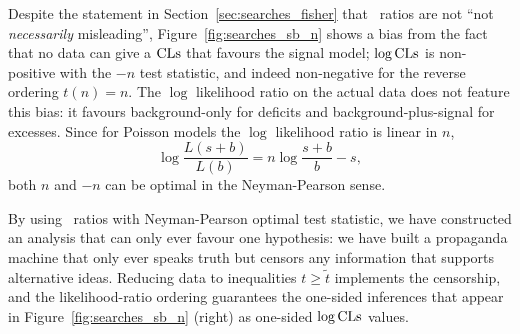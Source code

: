 Despite the statement in Section~\ref{sec:searches_fisher} that \pvalue\
ratios are not ``not \emph{necessarily} misleading'',
Figure~\ref{fig:searches_sb_n} shows a bias from the fact that
no data can give a $\mathrm{CLs}$ that favours the signal model;
$\log\mathrm{CLs}$ is non-positive with the $-n$ test statistic, and indeed non-negative
for the reverse ordering $t(n) = n$.
The $\log$ likelihood ratio on the actual data does not feature this bias:
it favours background-only for deficits and background-plus-signal for
excesses.
Since for Poisson models the $\log$ likelihood ratio is linear in $n$,
\begin{equation}
\log \frac{L(s + b)}{L(b)}
= n\log\frac{s + b}{b} - s
,
\end{equation}
both $n$ and $-n$ can be optimal in the Neyman-Pearson sense.

By using \pvalue\ ratios with Neyman-Pearson optimal test statistic, we have
constructed an analysis that can only ever favour one hypothesis:
we have built a propaganda machine that only ever speaks truth but censors any
information that supports alternative ideas.
Reducing data to inequalities $t \geq \tilde{t}$ implements the censorship,
and the likelihood-ratio ordering guarantees the one-sided inferences
that appear in Figure~\ref{fig:searches_sb_n} (right) as one-sided
$\log\mathrm{CLs}$ values.

